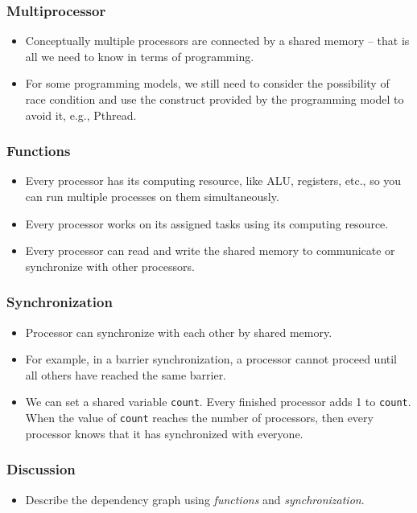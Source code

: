 \documentclass{beamer}
\begin{document}
\begin{CJK}{UTF8}{bsmi}
\begin{frame}
\frametitle{Multiprocessor}
\begin{itemize}
\item Conceptually multiple processors are connected by a shared
  memory -- that is all we need to know in terms of programming.
\item For some programming models, we still need to consider the possibility of race condition and use the construct provided by the programming model to avoid it, e.g., Pthread.
\end{itemize}
\end{frame}

\begin{frame}
\frametitle{Functions} 
\begin{itemize}
\item Every processor has its computing resource, like ALU, registers, etc., so you can run multiple processes on them simultaneously.
\item Every processor works on its assigned tasks using its computing resource.
\item Every processor can read and write the shared memory to communicate or synchronize with other processors.
\end{itemize}
\end{frame}

\begin{frame}
\frametitle{Synchronization}
\begin{itemize}
\item Processor can synchronize with each other by shared memory.
\item For example, in a barrier synchronization, a processor cannot proceed until all others have reached the same barrier.
\item We can set a shared variable {\tt count}. 
Every finished processor adds 1 to {\tt count}. 
When the value of {\tt count} reaches the number of processors, then every processor knows that it has synchronized with everyone.
\end{itemize}
\end{frame}

\begin{frame}
\frametitle{Discussion}
\begin{itemize}
\item Describe the dependency graph using {\em functions} and {\em
  synchronization}.
\end{itemize}
\end{frame}


\end{CJK}
\end{document}
